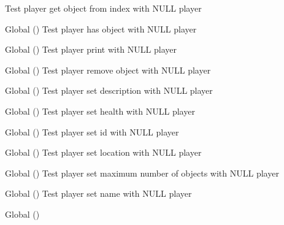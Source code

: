 \begin{DoxyRefList}
%
Test player get object from index with NULL player  
\item[Global \doxylink{player__test_8c_ae8953d45d8f555a930dbc8aba101d399}{test2\+\_\+player\+\_\+has\+\_\+object} ()]\label{test__test000133}%
%
Test player has object with NULL player  
\item[Global \doxylink{player__test_8c_a46b5c792a37831e8c142d4c32b9767f7}{test2\+\_\+player\+\_\+print} ()]\label{test__test000121}%
%
Test player print with NULL player  
\item[Global \doxylink{player__test_8c_af9e74e12ad6961761f1ff61afa56be3e}{test2\+\_\+player\+\_\+remove\+\_\+object} ()]\label{test__test000131}%
%
Test player remove object with NULL player  
\item[Global \doxylink{player__test_8c_a1e47a0571a050194ebe7f0cf6102033e}{test2\+\_\+player\+\_\+set\+\_\+description} ()]\label{test__test000117}%
%
Test player set description with NULL player  
\item[Global \doxylink{player__test_8c_aca602481af023c45a1fe6825860aa184}{test2\+\_\+player\+\_\+set\+\_\+health} ()]\label{test__test000111}%
%
Test player set health with NULL player  
\item[Global \doxylink{player__test_8c_a3695e0896bc3d770290e6a691fa212f7}{test2\+\_\+player\+\_\+set\+\_\+id} ()]\label{test__test000103}%
%
Test player set id with NULL player  
\item[Global \doxylink{player__test_8c_a2c702753d9e2e3df9ef4abf2d1b9bc8d}{test2\+\_\+player\+\_\+set\+\_\+location} ()]\label{test__test000125}%
%
Test player set location with NULL player  
\item[Global \doxylink{player__test_8c_aebb4907ff20d7692475a1f599182e5de}{test2\+\_\+player\+\_\+set\+\_\+max\+\_\+objs} ()]\label{test__test000137}%
%
Test player set maximum number of objects with NULL player  
\item[Global \doxylink{player__test_8c_a6e7ce8ff791f4bf63749df647a44263f}{test2\+\_\+player\+\_\+set\+\_\+name} ()]\label{test__test000107}%
%
Test player set name with NULL player  
\item[Global \doxylink{set__test_8c_a8f373a2609fb5770b0663e26df0cb7c4}{test2\+\_\+set\+\_\+add\+\_\+id} ()]\label{test__test000143}%
%

\end{DoxyRefList}
